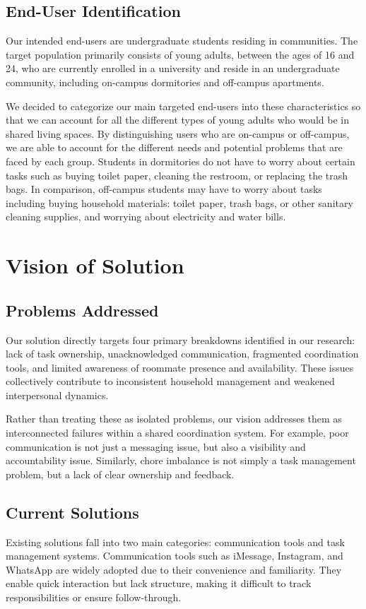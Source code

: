 \documentclass[sigconf]{acmart}
\begin{document}
\subsection{End-User Identification}
Our intended end-users are undergraduate students residing in communities. The target population primarily consists of young adults, between the ages of 16 and 24, who are currently enrolled in a university and reside in an undergraduate community, including on-campus dormitories and off-campus apartments.

We decided to categorize our main targeted end-users into these characteristics so that we can account for all the different types of young adults who would be in shared living spaces. By distinguishing users who are on-campus or off-campus, we are able to account for the different needs and potential problems that are faced by each group. Students in dormitories do not have to worry about certain tasks such as buying toilet paper, cleaning the restroom, or replacing the trash bags. In comparison, off-campus students may have to worry about tasks including buying household materials: toilet paper, trash bags, or other sanitary cleaning supplies, and worrying about electricity and water bills.


\section{Vision of Solution}

\subsection{Problems Addressed}
Our solution directly targets four primary breakdowns identified in our research: lack of task ownership, unacknowledged communication, fragmented coordination tools, and limited awareness of roommate presence and availability. These issues collectively contribute to inconsistent household management and weakened interpersonal dynamics.

Rather than treating these as isolated problems, our vision addresses them as interconnected failures within a shared coordination system. For example, poor communication is not just a messaging issue, but also a visibility and accountability issue. Similarly, chore imbalance is not simply a task management problem, but a lack of clear ownership and feedback.

\subsection{Current Solutions}
Existing solutions fall into two main categories: communication tools and task management systems. Communication tools such as iMessage, Instagram, and WhatsApp are widely adopted due to their convenience and familiarity. They enable quick interaction but lack structure, making it difficult to track responsibilities or ensure follow-through.
\end{document}
